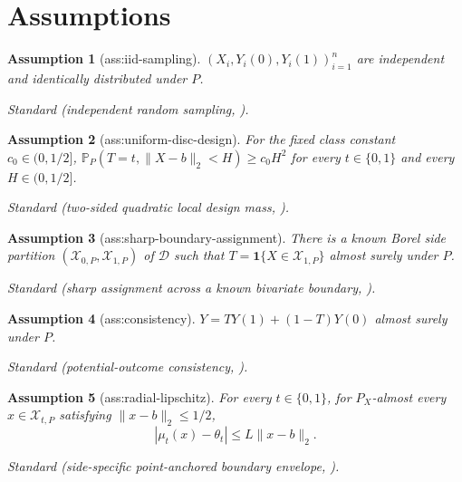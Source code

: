 \documentclass{article}
\newtheorem{assumption}{Assumption}
\begin{document}
\section{Assumptions}

\begin{assumption}[ass:iid-sampling]\label{ass:iid-sampling}
\((X_i,Y_i(0),Y_i(1))_{i=1}^n\) are independent and identically distributed under \(P\).
\par\smallskip\noindent\emph{Standard} (independent random sampling, \cite{CattaneoTitiunikYu2026Distance}).
\end{assumption}

\begin{assumption}[ass:uniform-disc-design]\label{ass:uniform-disc-design}
For the fixed class constant \(c_0\in(0,1/2]\), \(\mathbb P_P(T=t,\lVert X-b\rVert_2<H)\geq c_0H^2\) for every \(t\in\{0,1\}\) and every \(H\in(0,1/2]\).
\par\smallskip\noindent\emph{Standard} (two-sided quadratic local design mass, \cite{CattaneoTitiunikYu2026Distance}).
\end{assumption}

\begin{assumption}[ass:sharp-boundary-assignment]\label{ass:sharp-boundary-assignment}
There is a known Borel side partition \((\mathcal X_{0,P},\mathcal X_{1,P})\) of \(\mathcal D\) such that \(T=\mathbf 1\{X\in\mathcal X_{1,P}\}\) almost surely under \(P\).
\par\smallskip\noindent\emph{Standard} (sharp assignment across a known bivariate boundary, \cite{CattaneoTitiunikYu2026Distance}).
\end{assumption}

\begin{assumption}[ass:consistency]\label{ass:consistency}
\(Y=T Y(1)+(1-T)Y(0)\) almost surely under \(P\).
\par\smallskip\noindent\emph{Standard} (potential-outcome consistency, \cite{HahnToddVanderKlaauw2001RD}).
\end{assumption}

\begin{assumption}[ass:radial-lipschitz]\label{ass:radial-lipschitz}
For every \(t\in\{0,1\}\), for \(P_X\)-almost every \(x\in\mathcal X_{t,P}\) satisfying \(\lVert x-b\rVert_2\leq1/2\),
\[
 |\mu_t(x)-\theta_t|\leq L\lVert x-b\rVert_2.
\]
\par\smallskip\noindent\emph{Standard} (side-specific point-anchored boundary envelope, \cite{ArmstrongKolesar2020Honest}).
\end{assumption}
\end{document}
